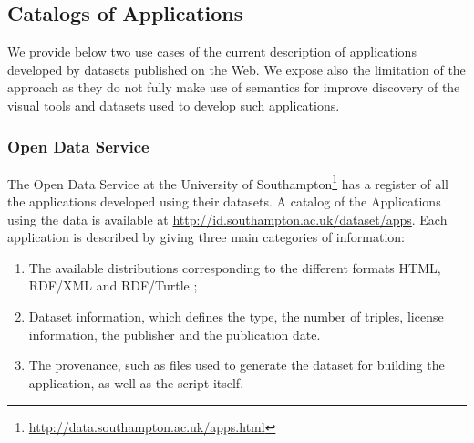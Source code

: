 \subsection{Catalogs of Applications}
We provide below two use cases of the current description of applications developed by datasets published on the Web. We expose also the limitation of the approach as they do not fully make use of semantics for improve discovery of the visual tools and datasets used to develop such applications.

\subsubsection{Open Data Service}
The Open Data Service at the University of Southampton\footnote{\url{http://data.southampton.ac.uk/apps.html}} has a register of all the applications developed using their datasets. A catalog of the Applications using the data is available at \url{http://id.southampton.ac.uk/dataset/apps}. Each application is described by giving three main categories of information:
\begin{enumerate}
\item The available distributions corresponding to the different formats HTML, RDF/XML and RDF/Turtle ;
\item Dataset information, which defines the type, the number of triples, license information, the publisher and the publication date.
\item The provenance, such as files used to generate the dataset for building the application, as well as the script itself.
\end{enumerate}



